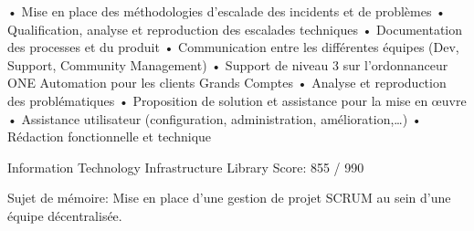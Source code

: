 \documentclass[
	a4paper,
]{fortysecondscv}
\begin{document}
\begin{cvtable}[3]
        {
            • Mise en place des méthodologies d'escalade des incidents et de 
            problèmes\newline
            • Qualification, analyse et reproduction des escalades techniques
            \newline
            • Documentation des processes et du produit\newline
            • Communication entre les différentes équipes (Dev, Support, 
            \newline Community Management)\newline
        }
        {
            • Support de niveau 3 sur l'ordonnanceur ONE Automation pour les 
            clients Grands Comptes\newline
            • Analyse et reproduction des problématiques\newline
            • Proposition de solution et assistance pour la mise en œuvre\newline
            • Assistance utilisateur (configuration, administration, 
            \newline amélioration,…)\newline
            • Rédaction fonctionnelle et technique\newline
        }
\end{cvtable}


\begin{cvtable}[1.5]
		{Information Technology Infrastructure Library}
		{Score: 855 / 990\\}
\end{cvtable}


\begin{cvtable}[1.5]
		{Sujet de mémoire: Mise en place d'une gestion de projet SCRUM au sein 
        d'une équipe décentralisée.}
\end{cvtable}
\end{document}
